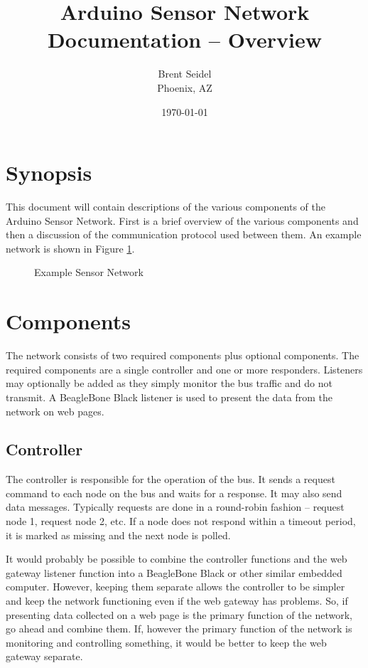 \documentclass[10pt, openany, draft]{article}
\title{Arduino Sensor Network Documentation -- Overview}
\author{Brent Seidel \\ Phoenix, AZ}
\date{ \today }
\begin{document}
\maketitle
\section{Synopsis}
This document will contain descriptions of the various components of the Arduino Sensor Network.  First is a brief overview of the various components and then a discussion of the communication protocol used between them.  An example network is shown in Figure \ref{fig:Example}.

\begin{figure}
  \centering
  
  \caption{Example Sensor Network}
  \label{fig:Example}
\end{figure}

\section{Components}
The network consists of two required components plus optional components.  The required components are a single controller and one or more responders.  Listeners may optionally be added as they simply monitor the bus traffic and do not transmit.  A BeagleBone Black listener is used to present the data from the network on web pages.

\subsection{Controller}
The controller is responsible for the operation of the bus.  It sends a request command to each node on the bus and waits for a response.  It may also send data messages.  Typically requests are done in a round-robin fashion -- request node 1, request node 2, etc.  If a node does not respond within a timeout period, it is marked as missing and the next node is polled.

It would probably be possible to combine the controller functions and the web gateway listener function into a BeagleBone Black or other similar embedded computer.  However, keeping them separate allows the controller to be simpler and keep the network functioning even if the web gateway has problems.  So, if presenting data collected on a web page is the primary function of the network, go ahead and combine them.  If, however the primary function of the network is monitoring and controlling something, it would be better to keep the web gateway separate.
\end{document}
